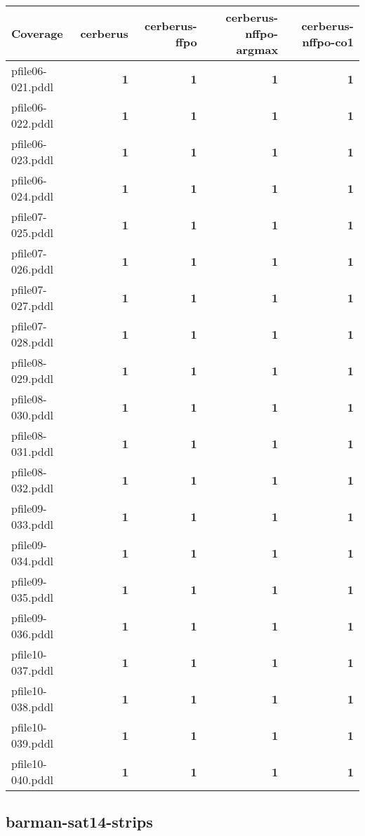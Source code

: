\documentclass{article}
\begin{document}
\begin{tabular}{@{}lrrrr@{}}
Coverage & cerberus & cerberus-ffpo & cerberus-nffpo-argmax & cerberus-nffpo-co1 \\
\midrule
pfile06-021.pddl & \textbf{1} & \textbf{1} & \textbf{1} & \textbf{1} \\
pfile06-022.pddl & \textbf{1} & \textbf{1} & \textbf{1} & \textbf{1} \\
pfile06-023.pddl & \textbf{1} & \textbf{1} & \textbf{1} & \textbf{1} \\
pfile06-024.pddl & \textbf{1} & \textbf{1} & \textbf{1} & \textbf{1} \\
pfile07-025.pddl & \textbf{1} & \textbf{1} & \textbf{1} & \textbf{1} \\
pfile07-026.pddl & \textbf{1} & \textbf{1} & \textbf{1} & \textbf{1} \\
pfile07-027.pddl & \textbf{1} & \textbf{1} & \textbf{1} & \textbf{1} \\
pfile07-028.pddl & \textbf{1} & \textbf{1} & \textbf{1} & \textbf{1} \\
pfile08-029.pddl & \textbf{1} & \textbf{1} & \textbf{1} & \textbf{1} \\
pfile08-030.pddl & \textbf{1} & \textbf{1} & \textbf{1} & \textbf{1} \\
pfile08-031.pddl & \textbf{1} & \textbf{1} & \textbf{1} & \textbf{1} \\
pfile08-032.pddl & \textbf{1} & \textbf{1} & \textbf{1} & \textbf{1} \\
pfile09-033.pddl & \textbf{1} & \textbf{1} & \textbf{1} & \textbf{1} \\
pfile09-034.pddl & \textbf{1} & \textbf{1} & \textbf{1} & \textbf{1} \\
pfile09-035.pddl & \textbf{1} & \textbf{1} & \textbf{1} & \textbf{1} \\
pfile09-036.pddl & \textbf{1} & \textbf{1} & \textbf{1} & \textbf{1} \\
pfile10-037.pddl & \textbf{1} & \textbf{1} & \textbf{1} & \textbf{1} \\
pfile10-038.pddl & \textbf{1} & \textbf{1} & \textbf{1} & \textbf{1} \\
pfile10-039.pddl & \textbf{1} & \textbf{1} & \textbf{1} & \textbf{1} \\
pfile10-040.pddl & \textbf{1} & \textbf{1} & \textbf{1} & \textbf{1} \\
\end{tabular}

\hypertarget{coverage-barman-sat14-strips}{}
\subsection*{barman-sat14-strips}
\end{document}
